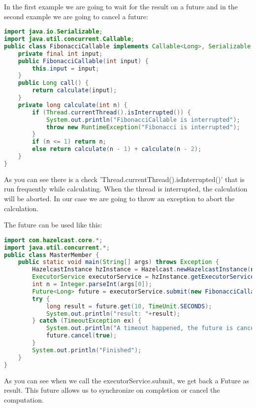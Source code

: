 In the first example we are going to wait for the result on a future and in the second example we are going to cancel a future:
\begin{lstlisting}[language=java]
import java.io.Serializable;
import java.util.concurrent.Callable;
public class FibonacciCallable implements Callable<Long>, Serializable {
    private final int input;
    public FibonacciCallable(int input) {
        this.input = input;
    }
    public Long call() {
        return calculate(input);
    }
    private long calculate(int n) {
        if (Thread.currentThread().isInterrupted()) {
            System.out.println("FibonacciCallable is interrupted");
            throw new RuntimeException("Fibonacci is interrupted");
        }
        if (n <= 1) return n;
        else return calculate(n - 1) + calculate(n - 2);
    }
}
\end{lstlisting}
As you can see there is a check 'Thread.currentThread().isInterrupted()' that is run frequently while calculating. When the thread is interrupted, the calculation will be aborted. In our case we are going to throw an exception to abort the calculation. 

The future can be used like this:
\begin{lstlisting}[language=java]
import com.hazelcast.core.*;
import java.util.concurrent.*;
public class MasterMember {
    public static void main(String[] args) throws Exception {
        HazelcastInstance hzInstance = Hazelcast.newHazelcastInstance(null);
        ExecutorService executorService = hzInstance.getExecutorService();
        int n = Integer.parseInt(args[0]);
        Future<Long> future = executorService.submit(new FibonacciCallable(n));
        try {
            long result = future.get(10, TimeUnit.SECONDS);
            System.out.println("result: "+result);
        } catch (TimeoutException ex) {
            System.out.println("A timeout happened, the future is cancelled");
            future.cancel(true);
        }
        System.out.println("Finished");
    }
}
\end{lstlisting}
As you can see when we call the executorService.submit, we get back a Future as result. This future allows us to synchronize on completion or cancel the computation. 

